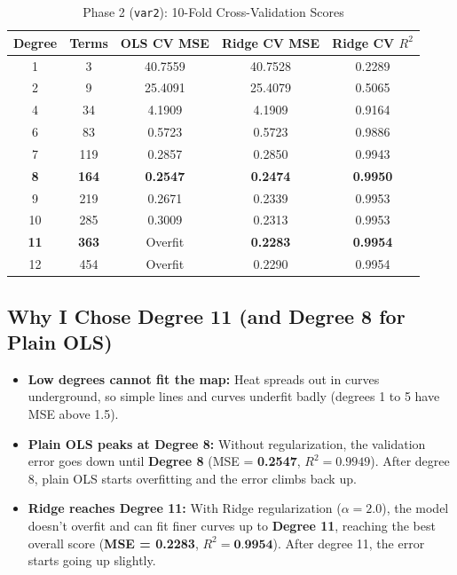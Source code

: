 \documentclass[11pt]{article}
\begin{document}
\begin{table}[htbp]
\centering
\caption{Phase 2 (\texttt{var2}): 10-Fold Cross-Validation Scores}
\label{tab:var2}
\small
\begin{tabular}{ccccc}
\toprule
\textbf{Degree} & \textbf{Terms} & \textbf{OLS CV MSE} & \textbf{Ridge CV MSE} & \textbf{Ridge CV $R^2$} \\
\midrule
1 & 3   & 40.7559 & 40.7528 & 0.2289 \\
2 & 9   & 25.4091 & 25.4079 & 0.5065 \\
4 & 34  & 4.1909  & 4.1909  & 0.9164 \\
6 & 83  & 0.5723  & 0.5723  & 0.9886 \\
7 & 119 & 0.2857  & 0.2850  & 0.9943 \\
\textbf{8} & \textbf{164} & \textbf{0.2547} & \textbf{0.2474} & \textbf{0.9950} \\
9 & 219 & 0.2671  & 0.2339  & 0.9953 \\
10 & 285 & 0.3009  & 0.2313  & 0.9953 \\
\textbf{11} & \textbf{363} & Overfit & \textbf{0.2283} & \textbf{0.9954} \\
12 & 454 & Overfit & 0.2290  & 0.9954 \\
\bottomrule
\end{tabular}
\end{table}

\subsection{Why I Chose Degree 11 (and Degree 8 for Plain OLS)}
\begin{itemize}\itemsep 0pt
    \item \textbf{Low degrees cannot fit the map:} Heat spreads out in curves underground, so simple lines and curves underfit badly (degrees 1 to 5 have MSE above 1.5).
    \item \textbf{Plain OLS peaks at Degree 8:} Without regularization, the validation error goes down until \textbf{Degree 8} (MSE = \textbf{0.2547}, $R^2 = 0.9949$). After degree 8, plain OLS starts overfitting and the error climbs back up.
    \item \textbf{Ridge reaches Degree 11:} With Ridge regularization ($\alpha = 2.0$), the model doesn't overfit and can fit finer curves up to \textbf{Degree 11}, reaching the best overall score (\textbf{MSE = 0.2283}, $R^2 = \textbf{0.9954}$). After degree 11, the error starts going up slightly.
\end{itemize}
\end{document}
